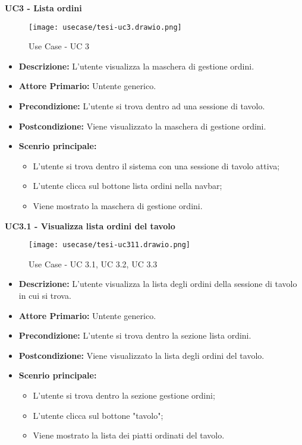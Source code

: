 \textbf{UC3 - Lista ordini}
\begin{figure}[H]
    \centering
    \texttt{[image: usecase/tesi-uc3.drawio.png]}
    \caption{Use Case - UC 3}
\end{figure}
\begin{itemize}
    \item \textbf{Descrizione:} L'utente visualizza la maschera di gestione ordini.
    \item \textbf{Attore Primario:} Untente generico.
    \item \textbf{Precondizione:} L'utente si trova dentro ad una sessione di tavolo.
    \item \textbf{Postcondizione:} Viene visualizzato la maschera di gestione ordini.
    \item \textbf{Scenrio principale:}
    \begin{itemize}
        \item L'utente si trova dentro il sistema con una sessione di tavolo attiva;
        \item L'utente clicca sul bottone lista ordini nella navbar;
        \item Viene mostrato la maschera di gestione ordini.
    \end{itemize}
\end{itemize}
\textbf{UC3.1 - Visualizza lista ordini del tavolo}
\begin{figure}[H]
    \centering
    \texttt{[image: usecase/tesi-uc311.drawio.png]}
    \caption{Use Case - UC 3.1, UC 3.2, UC 3.3}
\end{figure}
\begin{itemize}
    \item \textbf{Descrizione:} L'utente visualizza la lista degli ordini della sessione di tavolo in cui si trova. 
    \item \textbf{Attore Primario:} Untente generico.
    \item \textbf{Precondizione:} L'utente si trova dentro la sezione lista ordini.
    \item \textbf{Postcondizione:} Viene visualizzato la lista degli ordini del tavolo.
    \item \textbf{Scenrio principale:}
    \begin{itemize}
        \item L'utente si trova dentro la sezione gestione ordini;
        \item L'utente clicca sul bottone "tavolo";
        \item Viene mostrato la lista dei piatti ordinati del tavolo.
    \end{itemize}
\end{itemize}
